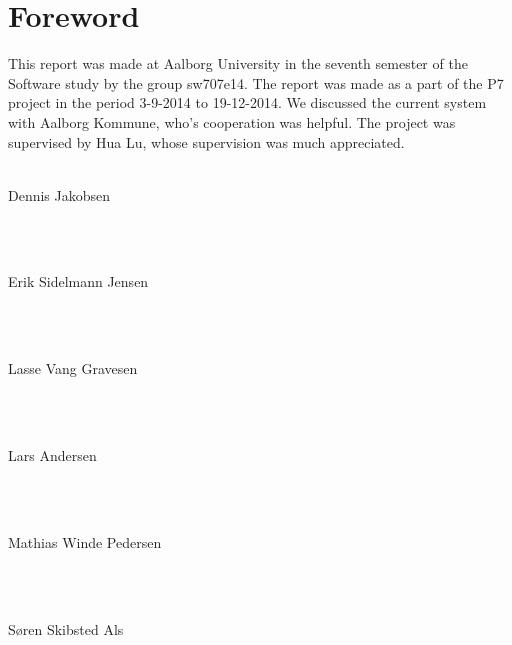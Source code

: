 \thispagestyle{empty}
\section*{Foreword}
\noindent This report was made at Aalborg University in the seventh semester of the Software study by the group sw707e14. The report was made as a part of the P7 project in the period 3-9-2014 to 19-12-2014. We discussed the current system with Aalborg Kommune, who's cooperation was helpful. The project was supervised by Hua Lu, whose supervision was much appreciated. \\ \\

\noindent
\vspace{5mm}
\parbox[h]{4cm}{Dennis Jakobsen}\hspace{0.5cm} \makebox[7cm]{\hrulefill} \\ \\
\vspace{5mm}
\parbox[h]{4cm}{Erik Sidelmann Jensen}\hspace{0.5cm} \makebox[7cm]{\hrulefill} \\ \\
\vspace{5mm}
\parbox[h]{4cm}{Lasse Vang Gravesen}\hspace{0.5cm} \makebox[7cm]{\hrulefill} \\ \\
\vspace{5mm}
\parbox[h]{4cm}{Lars Andersen}\hspace{0.5cm} \makebox[7cm]{\hrulefill} \\ \\
\vspace{5mm}
\parbox[h]{4cm}{Mathias Winde Pedersen}\hspace{0.5cm} \makebox[7cm]{\hrulefill} \\ \\
\vspace{5mm}
\parbox[h]{4cm}{Søren Skibsted Als}\hspace{0.5cm} \makebox[7cm]{\hrulefill} \\ \\

\newpage